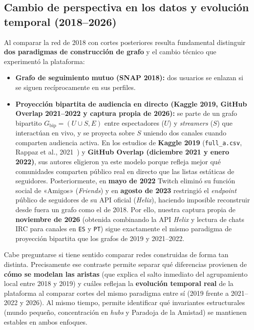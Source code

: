 \documentclass[11pt,a4paper]{article}
\begin{document}
\subsection{Cambio de perspectiva en los datos y evolución temporal (2018--2026)}
Al comparar la red de 2018 con cortes posteriores resulta fundamental distinguir \textbf{dos paradigmas de construcción de grafo} y el cambio técnico que experimentó la plataforma:
\begin{itemize}[leftmargin=*, itemsep=2pt]
  \item \textbf{Grafo de seguimiento mutuo (SNAP 2018):} dos usuarios se enlazan si se siguen recíprocamente en sus perfiles.
  \item \textbf{Proyección bipartita de audiencia en directo (Kaggle 2019, GitHub Overlap 2021--2022 y captura propia de 2026):} se parte de un grafo bipartito $G_{\text{bip}} = (U \cup S, E)$ entre espectadores ($U$) y \textit{streamers} ($S$) que interactúan en vivo, y se proyecta sobre $S$ uniendo dos canales cuando comparten audiencia activa. En los estudios de \textbf{Kaggle 2019} (\texttt{full\_a.csv}, Rappaz et al., 2021~\cite{rappaz2021}) y \textbf{GitHub Overlap (diciembre 2021 y enero 2022)}, sus autores eligieron ya este modelo porque refleja mejor qué comunidades comparten público real en directo que las listas estáticas de seguidores. Posteriormente, en \textbf{mayo de 2022} Twitch eliminó su función social de «Amigos» (\textit{Friends}) y en \textbf{agosto de 2023} restringió el \textit{endpoint} público de seguidores de su API oficial (\textit{Helix}), haciendo imposible reconstruir desde fuera un grafo como el de 2018. Por ello, nuestra captura propia de \textbf{noviembre de 2026} (obtenida combinando la API \textit{Helix} y lectura de chats IRC para canales en \texttt{ES} y \texttt{PT}) sigue exactamente el mismo paradigma de proyección bipartita que los grafos de 2019 y 2021--2022.
\end{itemize}

Cabe preguntarse si tiene sentido comparar redes construidas de forma tan distinta. Precisamente ese contraste permite separar qué diferencias provienen de \textbf{cómo se modelan las aristas} (que explica el salto inmediato del agrupamiento local entre 2018 y 2019) y cuáles reflejan la \textbf{evolución temporal real} de la plataforma al comparar cortes del mismo paradigma entre sí (2019 frente a 2021--2022 y 2026). Al mismo tiempo, permite identificar qué invariantes estructurales (mundo pequeño, concentración en \textit{hubs} y Paradoja de la Amistad) se mantienen estables en ambos enfoques.
\end{document}
